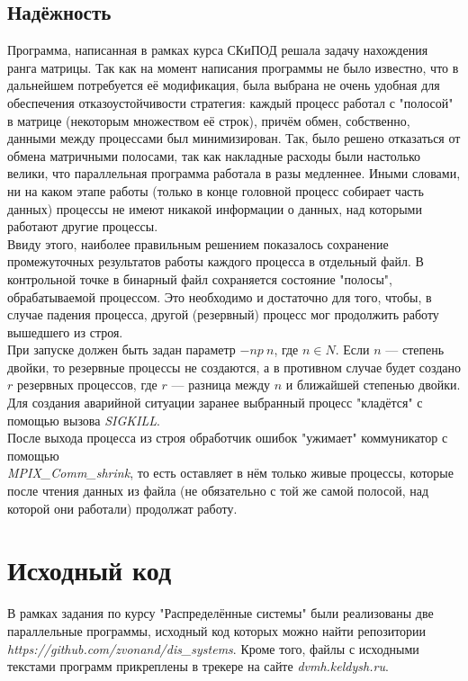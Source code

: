 \documentclass[a4paper]{article}
\begin{document}
\subsection{Надёжность}
Программа, написанная в рамках курса СКиПОД решала задачу нахождения ранга матрицы. Так как на момент написания программы не было известно, что в дальнейшем потребуется её модификация, была выбрана не очень удобная для обеспечения отказоустойчивости стратегия: каждый процесс работал с "полосой" в матрице (некоторым множеством её строк), причём обмен, собственно, данными между процессами был минимизирован. Так, было решено отказаться от обмена матричными полосами, так как накладные расходы были настолько велики, что параллельная программа работала в разы медленнее. Иными словами, ни на каком этапе работы (только в конце головной процесс собирает часть данных) процессы не имеют никакой информации о данных, над которыми работают другие процессы.\\
Ввиду этого, наиболее правильным решением показалось сохранение промежуточных результатов работы каждого процесса в отдельный файл. В контрольной точке в бинарный файл сохраняется состояние "полосы", обрабатываемой процессом. Это необходимо и достаточно для того, чтобы, в случае падения процесса, другой (резервный) процесс мог продолжить работу вышедшего из строя.\\
При запуске должен быть задан параметр $-np\ n$, где $n \in N$. Если $n$ --- степень двойки, то резервные процессы не создаются, а в противном случае будет создано $r$ резервных процессов, где $r$ --- разница между $n$ и ближайшей степенью двойки. Для создания аварийной ситуации заранее выбранный процесс "кладётся" с помощью вызова \textit{SIGKILL}.\\
После выхода процесса из строя обработчик ошибок "ужимает" коммуникатор с помощью \\ \textit{MPIX\_Comm\_shrink}, то есть оставляет в нём только живые процессы, которые после чтения данных из файла (не обязательно с той же самой полосой, над которой они работали) продолжат работу.


\section{Исходный код}
В рамках задания по курсу "Распределённые системы" были реализованы две параллельные программы, исходный код которых можно найти репозитории \textit{https://github.com/zvonand/dis\_systems}. Кроме того, файлы с исходными текстами программ прикреплены в трекере на сайте \textit{dvmh.keldysh.ru}.
\end{document}
